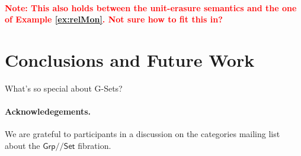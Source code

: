 \documentclass[a4paper,UKenglish]{lipics}
\newcommand\note[1]{{ \bf \textcolor{red} {\vspace{2mm}\; \\ Note: #1\\}}}
\newcommand{\SystemF}{System F\xspace}
\newcommand{\ra}{\rightarrow}
\newcommand{\msf}[1]{\mathsf{#1}} %
\newcommand{\Grp}{\msf{Grp}}
\newcommand{\Set}{\msf{Set}}
\newcommand{\Lslice}[1]{#1/\!/\Set}
\newcommand{\GrpSet}{\Lslice{\Grp}}
\newcommand{\sem}[1]{\ensuremath{\llbracket #1 \rrbracket} \;}
\begin{document}
\note{This also holds between the unit-erasure semantics and the one
  of Example \ref{ex:relMon}. Not sure how to fit this in?}

\section{Conclusions and Future Work} \label{sec:con}
What's so special about G-Sets?

\paragraph*{Acknowledegements.}
We are grateful to participants in a discussion on the categories mailing list
about the $\GrpSet$ fibration.


\end{document}
